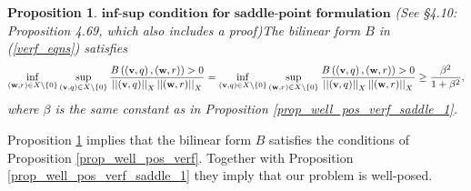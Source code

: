 \documentclass[12pt,a4paper]{article}
\newtheorem{proposition}[theorem]{Proposition}
\theoremstyle{definition}
\begin{document}
\begin{proposition}{$\textbf{inf-sup condition for saddle-point formulation}$} (See \cite{verfurth2013posteriori} \S 4.10: Proposition 4.69, which also includes a proof)\label{prop_well_pos_verf_saddle}
	The bilinear form $B$ in (\ref{verf_eqns}) satisfies
	\begin{equation}\small
	\inf_{\left(\textbf{w},r\right)\in X\setminus \lbrace0\rbrace}\sup_{\left(\textbf{v},q\right) \in X\setminus \lbrace0\rbrace}\frac{B\left(\left(\textbf{v},q\right),\left(\textbf{w},r\right)\right)>0}{\left|\left|\left(\textbf{v},q\right)\right|\right|_X\left|\left|\left(\textbf{w},r\right)\right|\right|_X}=
	\inf_{\left(\textbf{v},q\right) \in X\setminus \lbrace 0\rbrace}\sup_{\left(\textbf{w},r\right)\in X\setminus \lbrace0\rbrace}\frac{B\left(\left(\textbf{v},q\right),\left(\textbf{w},r\right)\right)>0}{\left|\left|\left(\textbf{v},q\right)\right|\right|_X\left|\left|\left(\textbf{w},r\right)\right|\right|_X}\geq \frac{\beta^2}{1+\beta^2},\nonumber
	\end{equation}
	where $\beta$ is the same constant as in Proposition \ref{prop_well_pos_verf_saddle_1}.
\end{proposition}
Proposition \ref{prop_well_pos_verf_saddle} implies that the bilinear form $B$ satisfies the conditions of Proposition \ref{prop_well_pos_verf}.  Together with Proposition \ref{prop_well_pos_verf_saddle_1} they imply that  our problem is well-posed.
\end{document}
